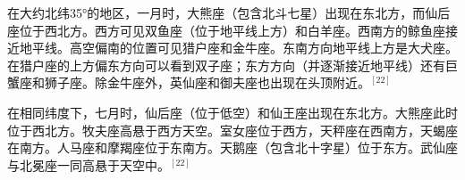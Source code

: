 在大约北纬35°的地区，一月时，大熊座（包含北斗七星）出现在东北方，而仙后座位于西北方。西方可见双鱼座（位于地平线上方）和白羊座。西南方的鲸鱼座接近地平线。高空偏南的位置可见猎户座和金牛座。东南方向地平线上方是大犬座。在猎户座的上方偏东方向可以看到双子座；东方方向（并逐渐接近地平线）还有巨蟹座和狮子座。除金牛座外，英仙座和御夫座也出现在头顶附近。$^{[22]}$

在相同纬度下，七月时，仙后座（位于低空）和仙王座出现在东北方。大熊座此时位于西北方。牧夫座高悬于西方天空。室女座位于西方，天秤座在西南方，天蝎座在南方。人马座和摩羯座位于东南方。天鹅座（包含北十字星）位于东方。武仙座与北冕座一同高悬于天空中。$^{[22]}$


